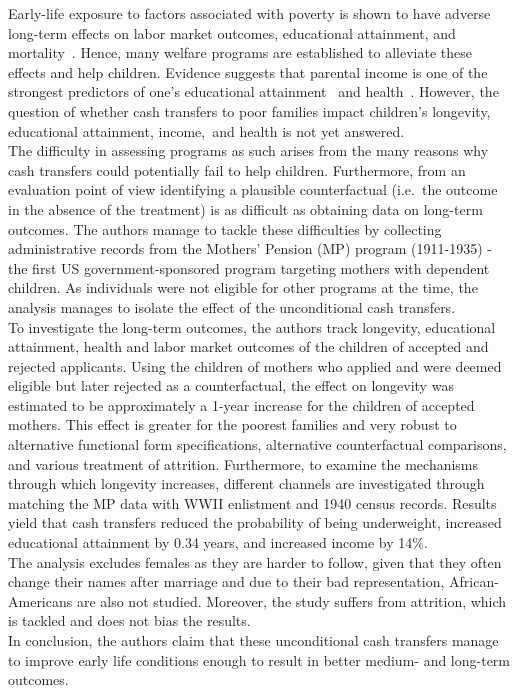 Early-life exposure to factors associated with poverty is shown to have
adverse long-term effects on labor market outcomes, educational
attainment, and mortality~\citep{Almond_2011}. Hence, many welfare
programs are established to alleviate these effects and help children.
Evidence suggests that parental income is one of the strongest
predictors of one's educational attainment~\citep{Barrow_2012} and
health~\citep{Case_2002}. However, the question of whether cash
transfers to poor families impact children's longevity, educational
attainment, income,~and health is not yet answered.\\
The difficulty in assessing programs as such arises from the many
reasons why cash transfers could potentially fail to help children.
Furthermore, from an evaluation point of view identifying a plausible
counterfactual (i.e.~the outcome in the absence of the treatment) is as
difficult as obtaining data on long-term outcomes. The authors manage to
tackle these difficulties by collecting administrative records from the
Mothers' Pension (MP) program (1911-1935) - the first US
government-sponsored program targeting mothers with dependent children.
As individuals were not eligible for other programs at the time, the
analysis manages to isolate the effect of the unconditional cash
transfers.\\
To investigate the long-term outcomes, the authors track longevity, educational
attainment, health and labor market outcomes of the children of accepted
and rejected applicants. Using the children of mothers who applied and
were deemed eligible but later rejected as a counterfactual, the effect
on longevity was estimated to be approximately a 1-year increase for the
children of accepted mothers. This effect is greater for the poorest
families and very robust to alternative functional form specifications,
alternative counterfactual comparisons, and various treatment of attrition.
Furthermore, to examine the mechanisms through which longevity
increases, different channels are investigated through matching the MP
data with WWII enlistment and 1940 census records. Results yield that
cash transfers reduced the probability of being underweight, increased
educational attainment by 0.34 years, and increased income by 14\%.\\
The analysis excludes females as they are harder to follow, given that
they often change their names after marriage and due to their bad
representation, African-Americans are also not studied. Moreover, the
study suffers from attrition, which is tackled and does not bias the
results.\\
In conclusion, the authors claim that these unconditional cash transfers
manage to improve early life conditions enough to result in better medium- and
long-term outcomes.

